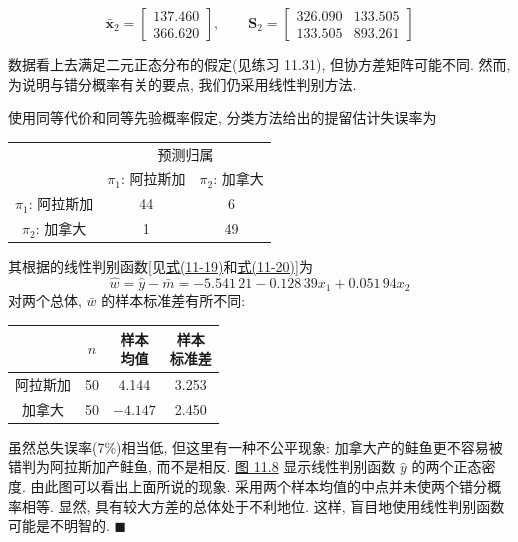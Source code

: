 
\[
\bar{\mathbf{x}}_2=\begin{bmatrix}137.460\\366.620\end{bmatrix},\qquad \mathbf{S}_2=\begin{bmatrix}326.090&133.505\\133.505&893.261\end{bmatrix}
\]

数据看上去满足二元正态分布的假定(见练习 11.31), 但协方差矩阵可能不同. 然而, 为说明与错分概率有关的要点, 我们仍采用线性判别方法.

使用同等代价和同等先验概率假定, 分类方法给出的提留估计失误率为

\begin{mvtable}
\begin{tabular}{ccc}
\toprule
& \multicolumn{2}{c}{预测归属}\\
\cmidrule(lr){2-3}
& $\pi_1$: 阿拉斯加 & $\pi_2$: 加拿大\\
\midrule
$\pi_1$: 阿拉斯加 & 44 & 6\\
$\pi_2$: 加拿大 & 1 & 49\\
\bottomrule
\end{tabular}
\end{mvtable}

其根据的线性判别函数[见\hyperref[eq:11-19]{式(11-19)}和\hyperref[eq:11-20]{式(11-20)}]为
\[
\hat{w}=\hat{y}-\bar{m}=-5.541\,21-0.128\,39x_1+0.051\,94x_2
\]
对两个总体, $\bar{w}$ 的样本标准差有所不同:

\begin{mvtable}
\begin{tabular}{cccc}
\toprule
& $n$ & \makecell{样本\\均值} & \makecell{样本\\标准差}\\
\midrule
阿拉斯加 & 50 & 4.144 & 3.253\\
加拿大 & 50 & $-4.147$ & 2.450\\
\bottomrule
\end{tabular}
\end{mvtable}

虽然总失误率(7\%)相当低, 但这里有一种不公平现象: 加拿大产的鲑鱼更不容易被错判为阿拉斯加产鲑鱼, 而不是相反. \hyperref[fig:11.8]{图 11.8} 显示线性判别函数 $\hat{y}$ 的两个正态密度. 由此图可以看出上面所说的现象. 采用两个样本均值的中点并未使两个错分概率相等. 显然, 具有较大方差的总体处于不利地位. 这样, 盲目地使用线性判别函数可能是不明智的. $\blacksquare$

